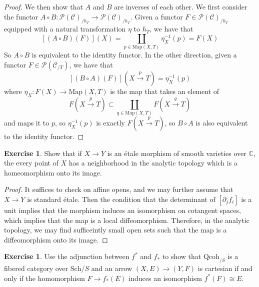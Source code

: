 \documentclass[psamsfonts, 12pt]{amsart}
\theoremstyle{definition}
\newtheorem{exer}[thm]{Exercise}
\theoremstyle{remark}
\newcommand{\C}{\mathbb{C}}
\newcommand{\inv}{^{-1}}
\begin{document}
\begin{proof}
We then show that $A$ and $B$ are inverses of each other. We first consider the
functor $A \circ B:\mathcal{P}(\mathcal{C})_{/h_T}\to\mathcal{P}(\mathcal{C})_{/h_T}$.
Given a functor $F \in \mathcal{P}(\mathcal{C})_{/h_T}$ equipped with a natural
transformation $\eta$ to $h_T$, we have that
\[
[(A \circ B)(F)](X) = \coprod_{p \in \mathrm{Map}(X,T)} \eta_X\inv(p) = F(X)
\]
So $A \circ B$ is equivalent to the identity functor. In the other direction, given
a functor $F \in \mathcal{P}(\mathcal{C}_{/T})$, we have that
\[
[(B \circ A)(F)](X\xrightarrow{p} T) = \eta_X\inv(p)
\]
where $\eta_X : F(X) \to \mathrm{Map}(X,T)$ is the map that takes an element of
\[
F(X \xrightarrow{p} T)
\subset \coprod_{q \in \mathrm{Map}(X,T)} F(X\xrightarrow{q} T)
\]
and maps it to $p$, so $\eta_X\inv(p)$ is exactly $F(X \xrightarrow{p} T)$, so
$B \circ A$ is also equivalent to the identity functor.
\end{proof}
%
\setcounter{section}{2}
%
\setcounter{thm}{1}
%
\begin{exer}
Show that if $X \to Y$ is an \'{e}tale morphism of smooth varieties over $\C$,
the every point of $X$ has a neighborhood in the analytic topology which
is a homeomorphism onto its image.
\end{exer}
%
\begin{proof}
It suffices to check on affine opens, and we may further assume that $X \to Y$ is
standard \'{e}tale. Then the condition that the determinant of $[\partial_jf_i]$ is
a unit implies that the morphism induces an isomorphism on cotangent spaces,
which implies that the map is a local diffeomorphism. Therefore, in the analytic
topology, we may find sufficeintly small open sets such that the map
is a diffeomorphism onto its image.
\end{proof}
%
\begin{exer}
Use the adjunction between $f^*$ and $f_*$ to show that $\mathrm{Qcoh}_{/S}$
is a fibered category over $\mathrm{Sch}/S$ and an arrow $(X,E) \to (Y,F)$ is
cartesian if and only if the homomorphism $F \to f_*(E)$ induces an isomorphism
$f^*(F) \cong E$.
\end{exer}
%
\end{document}
